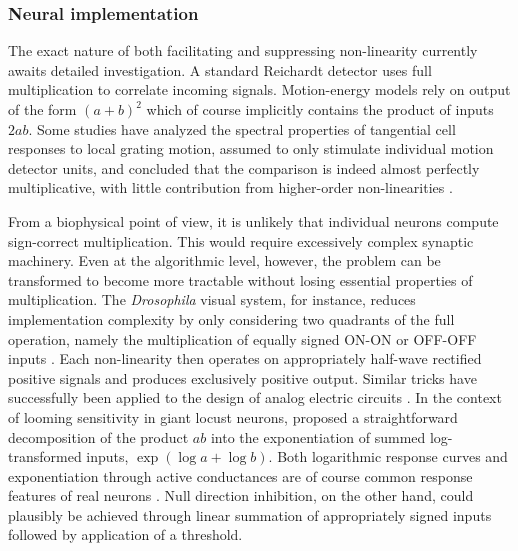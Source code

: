 \subsubsection{Neural implementation}
The exact nature of both facilitating and suppressing non-linearity currently awaits detailed investigation. A standard Reichardt detector uses full multiplication to correlate incoming signals. Motion-energy models rely on output of the form $(a+b)^2$ which of course implicitly contains the product of inputs $2ab$. Some studies have analyzed the spectral properties of tangential cell responses to local grating motion, assumed to only stimulate individual motion detector units, and concluded that the comparison is indeed almost perfectly multiplicative, with little contribution from higher-order non-linearities \citep{Egelhaaf:1989wf}.

From a biophysical point of view, it is unlikely that individual neurons compute sign-correct multiplication. This would require excessively complex synaptic machinery. Even at the algorithmic level, however, the problem can be transformed to become more tractable without losing essential properties of multiplication. The \textit{Drosophila} visual system, for instance, reduces implementation complexity by only considering two quadrants of the full operation, namely the multiplication of equally signed ON-ON or OFF-OFF inputs \citep{Eichner:2011ic}. Each non-linearity then operates on appropriately half-wave rectified positive signals and produces exclusively positive output. Similar tricks have successfully been applied to the design of analog electric circuits \citep{Mead:1989aa}. In the context of looming sensitivity in giant locust neurons, \citet{Gabbiani:2002kb} proposed a straightforward decomposition of the product $ab$ into the exponentiation of summed log-transformed inputs, $\exp(\log a + \log b)$. Both logarithmic response curves and exponentiation through active conductances are of course common response features of real neurons \citep{Koch:2004aa}. Null direction inhibition, on the other hand, could plausibly be achieved through linear summation of appropriately signed inputs followed by application of a threshold.

